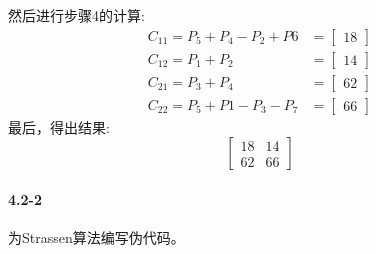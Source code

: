 \documentclass[a4paper,11pt]{article}
\begin{document}
然后进行步骤4的计算:
\begin{align*}
	C_{11} = P_{5} + P_{4} - P_{2} + P{6} &=
	\begin{bmatrix}
		18
	\end{bmatrix}\\
	C_{12} = P_{1} + P_{2} &=
	\begin{bmatrix}
		14
	\end{bmatrix}\\
	C_{21} = P_{3} + P_{4} &=
	\begin{bmatrix}
		62
	\end{bmatrix}\\
	C_{22} = P_{5}+P{1}-P_{3}-P_{7} &=
	\begin{bmatrix}
		66
	\end{bmatrix}
\end{align*}
最后，得出结果:
\[
	\begin{bmatrix}
	18 & 14\\
	62 & 66
	\end{bmatrix}
\]
	\paragraph*{4.2-2}
为Strassen算法编写伪代码。
\end{document}
